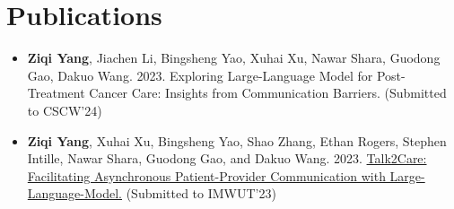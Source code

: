 \section{\textbf{Publications}}
\vspace{1mm}

\begin{justify}\begin{itemize}[leftmargin=3ex, rightmargin=2ex, noitemsep,labelsep=1.2mm,itemsep=1mm, label={$\circ$}]
\item \textbf{Ziqi Yang}, Jiachen Li, Bingsheng Yao, Xuhai Xu, Nawar Shara, Guodong Gao, Dakuo Wang. 2023. Exploring Large-Language Model for Post-Treatment Cancer Care: Insights from Communication Barriers. (Submitted to CSCW'24)
\item \textbf{Ziqi Yang}, Xuhai Xu, Bingsheng Yao, Shao Zhang, Ethan Rogers, Stephen Intille, Nawar Shara, Guodong Gao, and Dakuo Wang. 2023. \href{https://arxiv.org/abs/2309.09357}{Talk2Care: Facilitating Asynchronous Patient-Provider Communication with Large-Language-Model.} (Submitted to IMWUT'23)
\end{itemize}
\end{justify}


      \vspace{-3.0mm}